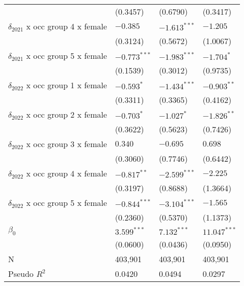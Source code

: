 \begin{tabular}{llll}
                                       &           (0.3457) &           (0.6790) &           (0.3417) \\
$\delta_{2021}$ x occ group 4 x female &           $-0.385$ &     $-1.613^{***}$ &           $-1.205$ \\
                                       &           (0.3124) &           (0.5672) &           (1.0067) \\
$\delta_{2021}$ x occ group 5 x female &     $-0.773^{***}$ &     $-1.983^{***}$ &         $-1.704^*$ \\
                                       &           (0.1539) &           (0.3012) &           (0.9735) \\
$\delta_{2022}$ x occ group 1 x female &         $-0.593^*$ &     $-1.434^{***}$ &      $-0.903^{**}$ \\
                                       &           (0.3311) &           (0.3365) &           (0.4162) \\
$\delta_{2022}$ x occ group 2 x female &         $-0.703^*$ &         $-1.027^*$ &      $-1.826^{**}$ \\
                                       &           (0.3622) &           (0.5623) &           (0.7426) \\
$\delta_{2022}$ x occ group 3 x female &            $0.340$ &           $-0.695$ &            $0.698$ \\
                                       &           (0.3060) &           (0.7746) &           (0.6442) \\
$\delta_{2022}$ x occ group 4 x female &      $-0.817^{**}$ &     $-2.599^{***}$ &           $-2.225$ \\
                                       &           (0.3197) &           (0.8688) &           (1.3664) \\
$\delta_{2022}$ x occ group 5 x female &     $-0.844^{***}$ &     $-3.104^{***}$ &           $-1.565$ \\
                                       &           (0.2360) &           (0.5370) &           (1.1373) \\
$\beta_0$                              &      $3.599^{***}$ &      $7.132^{***}$ &     $11.047^{***}$ \\
                                       &           (0.0600) &           (0.0436) &           (0.0950) \\
N                                      &            403,901 &            403,901 &            403,901 \\
Pseudo $R^2$                           &             0.0420 &             0.0494 &             0.0297 \\
\bottomrule
\end{tabular}
